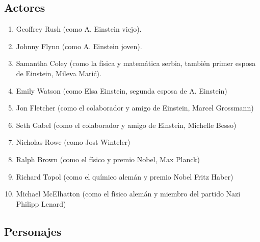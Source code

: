 \documentclass{article}
\begin{document}

\subsection*{Actores}


\begin{enumerate}

\item Geoffrey Rush (como A. Einstein viejo).

\item Johnny Flynn (como A. Einstein joven).

\item Samantha Coley (como la física y matemática serbia, también primer esposa de Einstein, Mileva Marić).

\item Emily Watson (como Elsa Einstein, segunda esposa de A. Einstein)

\item Jon Fletcher (como el colaborador y amigo de Einstein, Marcel Grossmann)

\item Seth Gabel (como el colaborador y amigo de Einstein, Michelle Besso)

\item Nicholas Rowe (como Jost Winteler)

\item Ralph Brown (como el físico y premio Nobel, Max Planck)

\item Richard Topol (como el químico alemán y premio Nobel Fritz Haber)

\item Michael McElhatton (como el físico alemán y miembro del partido Nazi Philipp Lenard)

\end{enumerate}

\fancyfoot[L]{}

\subsection*{Personajes}
\end{document}

